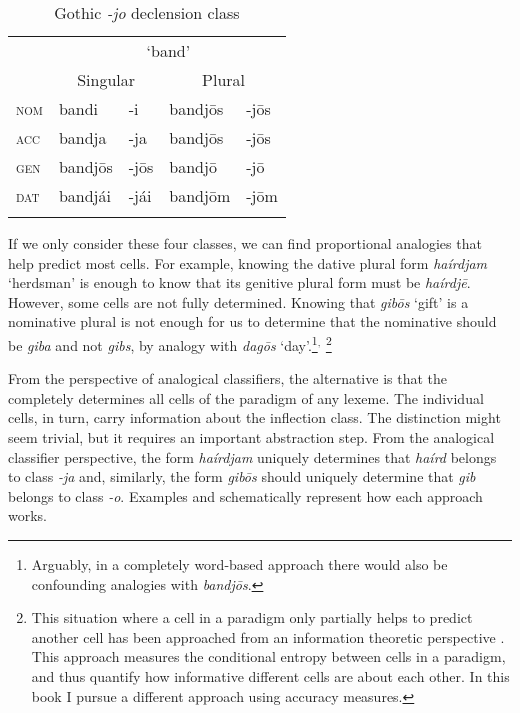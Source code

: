 \begin{table}[t]
  \centering
  \caption{Gothic \textit{-jo} declension class}\label{tab:jo-class-gothic}
  \begin{tabular}{lllll}
    \lsptoprule
        & \multicolumn{4}{c}{`band'}                                \\
        & \multicolumn{2}{c}{Singular} & \multicolumn{2}{c}{Plural} \\
    \midrule
    \textsc{nom} & bandi                        & -i   & bandjōs & -jōs      \\
    \textsc{acc} & bandja                       & -ja  & bandjōs & -jōs      \\
    \textsc{gen} & bandjōs                      & -jōs & bandjō  & -jō       \\
    \textsc{dat} & bandjái                      & -jái & bandjōm & -jōm      \\
    \lspbottomrule
  \end{tabular}
\end{table}

If we only consider these four classes, we can find proportional analogies that help predict most cells. For example, knowing the dative plural form \textit{haírdjam} `herdsman' is enough to know that its genitive plural form must be \textit{haírdjē}. However, some cells are not fully determined. Knowing that \textit{gibōs} `gift' is a nominative plural is not enough for us to determine that the nominative  should be \textit{giba} and not \textit{gibs}, by analogy with \textit{dagōs} `day'.\footnote{Arguably, in a completely word-based approach there would also be confounding analogies with \textit{bandjōs}.}$^{,}$ \footnote{This situation where a cell in a paradigm only partially helps to predict another cell has been approached from an information theoretic perspective \autocite{MoscosodelPradoMartin.2004a, Ackerman.2013a, Blevins.2013, Ackerman.2016, Bonami.2016}. This approach measures the conditional entropy between cells in a paradigm, and thus quantify how informative different cells are about each other. In this book I pursue a different approach using accuracy measures.}

\largerpage[2]
From the perspective of analogical classifiers, the alternative is that the  completely determines all cells of the paradigm of any lexeme. The individual cells, in turn, carry information about the inflection class. The distinction might seem trivial, but it requires an important abstraction step. From the analogical classifier perspective, the form \textit{haírdjam} uniquely determines that \textit{haírd} belongs to class \textit{-ja} and, similarly, the form \textit{gibōs} should uniquely determine that \textit{gib} belongs to class \textit{-o}. Examples  and  schematically represent how each approach works.

